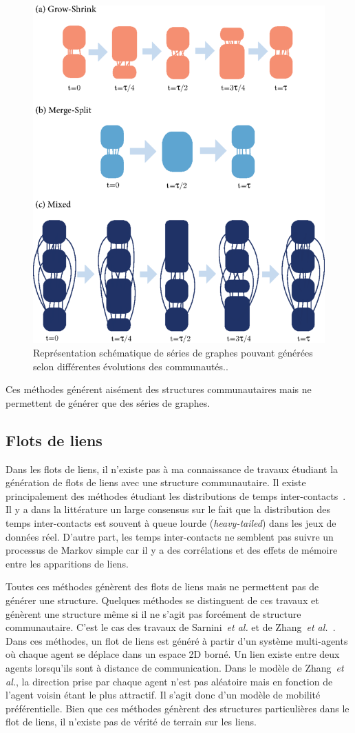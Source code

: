 \begin{figure}
\centering
\includegraphics[width=0.3\linewidth]{img/Qualite/Granell.png}
\caption{Représentation schématique de séries de graphes pouvant générées selon différentes évolutions des communautés.\protect\footnotemark.}
\label{fig:qualite_Grannell}
\end{figure}

Ces méthodes générent aisément des structures communautaires mais ne permettent de générer que des séries de graphes.

\subsection{Flots de liens}

Dans les flots de liens, il n'existe pas à ma connaissance de travaux étudiant la génération de flots de liens avec une structure communautaire.
Il existe principalement des méthodes étudiant les distributions de temps inter-contacts~\cite{Malmgren2008,Malmgren2009,Karsai2011,Miritello2011,Karsai2012a,Rocha2013,Vestergaard2014,Kivela2015}.
Il y a dans la littérature un large consensus sur le fait que la distribution des temps inter-contacts est souvent à queue lourde (\emph{heavy-tailed}) dans les jeux de données réel.
D'autre part, les temps inter-contacts ne semblent pas suivre un processus de Markov simple car il y a des corrélations et des effets de mémoire entre les apparitions de liens.

Toutes ces méthodes génèrent des flots de liens mais ne permettent pas de générer une structure.
Quelques méthodes se distinguent de ces travaux et génèrent une structure même si il ne s'agit pas forcément de structure communautaire.
C'est le cas des travaux de Sarnini~\emph{et al.}\cite{Starnini2013} et de Zhang~\emph{et al.}~\cite{Zhang2015a}.
Dans ces méthodes, un flot de liens est généré à partir d'un système multi-agents où chaque agent se déplace dans un espace 2D borné.
Un lien existe entre deux agents lorsqu'ils sont à distance de communication.
Dans le modèle de Zhang~\emph{et al.}, la direction prise par chaque agent n'est pas aléatoire mais en fonction de l'agent voisin étant le plus attractif.
Il s'agit donc d'un modèle de mobilité préférentielle.
Bien que ces méthodes génèrent des structures particulières dans le flot de liens, il n'existe pas de vérité de terrain sur les liens.



